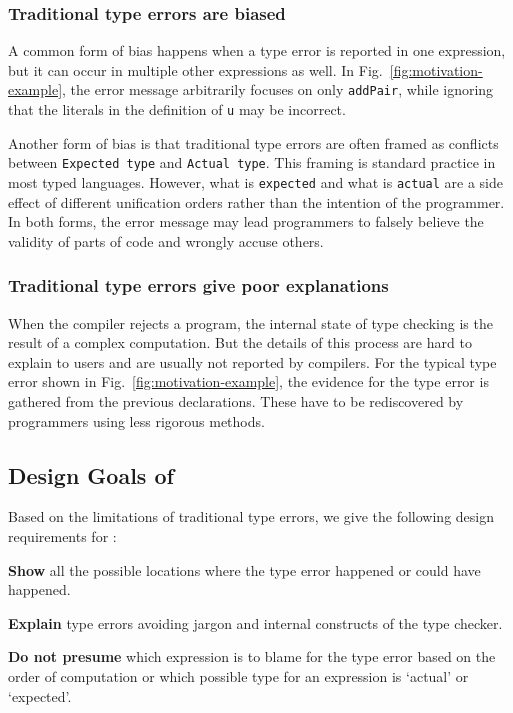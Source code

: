 \subsubsection{\textbf{Traditional type errors are biased}}
A common form of bias happens when a type error is reported in one expression, but it can occur in multiple other expressions as well. In Fig.~\ref{fig:motivation-example}, the error message arbitrarily focuses on only \texttt{addPair}, while ignoring that the literals in the definition of \texttt{u} may be incorrect. 

Another form of bias is that traditional type errors are often framed as conflicts between \texttt{Expected type} and \texttt{Actual type}. This framing is standard practice in most typed languages. However, what is \texttt{expected} and what is \texttt{actual} are a side effect of different unification orders rather than the intention of the programmer. In both forms, the error message may lead programmers to falsely believe the validity of parts of code and wrongly accuse others.

\subsubsection{\textbf{Traditional type errors give poor explanations}}
When the compiler rejects a program, the internal state of type checking is the result of a complex computation. But the details of this process are hard to explain to users and are usually not reported by compilers. For the typical type error shown in Fig.~\ref{fig:motivation-example}, the evidence for the type error is gathered from the previous declarations. These have to be rediscovered by programmers using less rigorous methods. 

\subsection{Design Goals of \chameleon{}}
Based on the limitations of traditional type errors, we give the following design requirements for \chameleon{}:

\noindent\textbf{Show} all the possible locations where the type error happened or could have happened.

\noindent\textbf{Explain} type errors avoiding jargon and internal constructs of the type checker.

\noindent\textbf{Do not presume} which expression is to blame for the type error based on the order of computation or which possible type for an expression is `actual' or `expected'.


